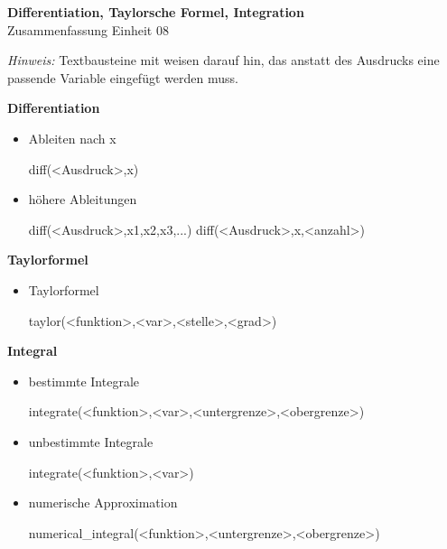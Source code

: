 \documentclass[a4paper,9pt,DIV15,twocolumn]{scrartcl}
\begin{document}
\begin{center}
    \textbf{\LARGE Differentiation, Taylorsche Formel, Integration}\\
    {\large Zusammenfassung Einheit 08}
\end{center}
\textsl{Hinweis:} Textbausteine mit  weisen darauf hin, das anstatt des Ausdrucks eine passende Variable eingefügt werden muss.

\medskip

\textbf{Differentiation}

\begin{itemize}
 \item Ableiten nach x
\begin{sagein}
diff(<Ausdruck>,x) 
\end{sagein}
\item höhere Ableitungen
\begin{sagein}
diff(<Ausdruck>,x1,x2,x3,...)
diff(<Ausdruck>,x,<anzahl>) 
\end{sagein}
\end{itemize}


\textbf{Taylorformel}

\begin{itemize}
 \item Taylorformel
\begin{sagein}
taylor(<funktion>,<var>,<stelle>,<grad>)
\end{sagein}
\end{itemize}

\textbf{Integral}

\begin{itemize}
 \item bestimmte Integrale
\begin{sagein}
integrate(<funktion>,<var>,<untergrenze>,<obergrenze>) 
\end{sagein}
\item unbestimmte Integrale
\begin{sagein}
integrate(<funktion>,<var>)
\end{sagein}
\item numerische Approximation
\begin{sagein}
numerical_integral(<funktion>,<untergrenze>,<obergrenze>) 
\end{sagein}
\end{itemize}
\end{document}
